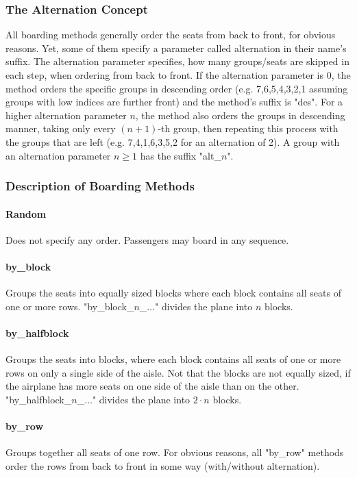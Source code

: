 \documentclass[11pt]{article}
\begin{document}
\subsubsection{The Alternation Concept}

All boarding methods generally order the seats from back to front, for obvious reasons. Yet, some of them specify a parameter called alternation in their name's suffix. The alternation parameter specifies, how many groups/seats are skipped in each step, when ordering from back to front. If the alternation parameter is 0, the method orders the specific groups in descending order (e.g. 7,6,5,4,3,2,1 assuming groups with low indices are further front) and the method's suffix is "des". For a higher alternation parameter $n$, the method also orders the groups in descending manner, taking only every $(n+1)$-th group, then repeating this process with the groups that are left (e.g. 7,4,1,6,3,5,2 for an alternation of 2). A group with an alternation parameter $n \geq 1$ has the suffix "alt\_$n$".



\subsubsection{Description of Boarding Methods}

\paragraph{Random} Does not specify any order. Passengers may board in any sequence.
\paragraph{by\_block} Groups the seats into equally sized blocks where each block contains all seats of one or more rows. "by\_block\_$n$\_$\dots$" 
divides the plane into $n$ blocks.
\paragraph{by\_halfblock} Groups the seats into blocks, where each block contains all seats of one or more rows on only a single side of the aisle. Not that the blocks are not equally sized, if the airplane has more seats on one side of the aisle than on the other. "by\_halfblock\_$n$\_$\dots$" divides the plane into $2\cdot n$ blocks.

\paragraph{by\_row} Groups together all seats of one row. For obvious reasons, all "by\_row" methods order the rows from back to front in some way (with/without alternation).
\end{document}
